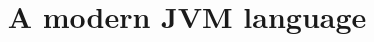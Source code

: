 \documentclass[10pt,xcolor={dvipsnames}]{beamer}
\begin{document}
{
	\title{A modern JVM language}	
	\maketitle
}

\end{document}
